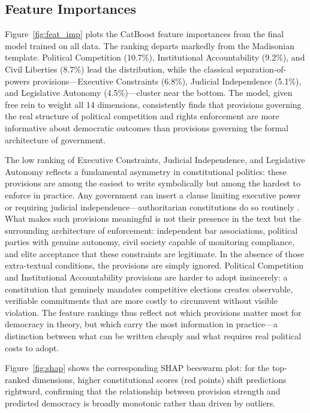 \documentclass[9pt,twoside]{pnas-new}
\begin{document}
\subsection*{Feature Importances}

Figure~\ref{fig:feat_imp} plots the CatBoost feature importances from the final model trained on all data. The ranking departs markedly from the Madisonian template. Political Competition (10.7\%), Institutional Accountability (9.2\%), and Civil Liberties (8.7\%) lead the distribution, while the classical separation-of-powers provisions---Executive Constraints (6.8\%), Judicial Independence (5.1\%), and Legislative Autonomy (4.5\%)---cluster near the bottom. The model, given free rein to weight all 14 dimensions, consistently finds that provisions governing the real structure of political competition and rights enforcement are more informative about democratic outcomes than provisions governing the formal architecture of government.

The low ranking of Executive Constraints, Judicial Independence, and Legislative Autonomy reflects a fundamental asymmetry in constitutional politics: these provisions are among the easiest to write symbolically but among the hardest to enforce in practice. Any government can insert a clause limiting executive power or requiring judicial independence---authoritarian constitutions do so routinely \cite{ginsburg_simpser_2014}. What makes such provisions meaningful is not their presence in the text but the surrounding architecture of enforcement: independent bar associations, political parties with genuine autonomy, civil society capable of monitoring compliance, and elite acceptance that these constraints are legitimate. In the absence of those extra-textual conditions, the provisions are simply ignored. Political Competition and Institutional Accountability provisions are harder to adopt insincerely: a constitution that genuinely mandates competitive elections creates observable, verifiable commitments that are more costly to circumvent without visible violation. The feature rankings thus reflect not which provisions matter most for democracy in theory, but which carry the most information in practice---a distinction between what can be written cheaply and what requires real political costs to adopt.

Figure~\ref{fig:shap} shows the corresponding SHAP beeswarm plot: for the top-ranked dimensions, higher constitutional scores (red points) shift predictions rightward, confirming that the relationship between provision strength and predicted democracy is broadly monotonic rather than driven by outliers.
\end{document}

